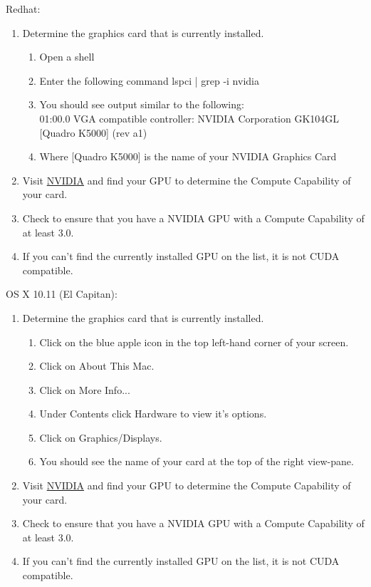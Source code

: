 \documentclass[12pt]{article}
\begin{document}
Redhat:
\begin{enumerate}
\item Determine the graphics card that is currently installed.
\begin{enumerate}
\item Open a shell
\item Enter the following command lspci | grep -i nvidia
\item You should see output similar to the following:\\
01:00.0 VGA compatible controller: NVIDIA Corporation GK104GL [Quadro K5000] (rev a1)
\item Where [Quadro K5000] is the name of your NVIDIA Graphics Card
\end{enumerate}
\item Visit \href{https://developer.nvidia.com/cuda-gpus}{NVIDIA} and find your GPU to determine the Compute Capability of your card.
\item Check to ensure that you have a NVIDIA GPU with a  Compute Capability of at least 3.0.
\item If you can't find the currently installed GPU on the list, it is not CUDA compatible.
\end{enumerate}

OS X 10.11 (El Capitan):
\begin{enumerate}
\item Determine the graphics card that is currently installed.
\begin{enumerate}
\item Click on the blue apple icon in the top left-hand corner of your screen.
\item Click on About This Mac.
\item Click on More Info...
\item Under Contents click Hardware to view it's options.
\item Click on Graphics/Displays.
\item You should see the name of your card at the top of the right view-pane.
\end{enumerate}
\item Visit \href{https://developer.nvidia.com/cuda-gpus}{NVIDIA} and find your GPU to determine the Compute Capability of your card.
\item Check to ensure that you have a NVIDIA GPU with a  Compute Capability of at least 3.0.
\item If you can't find the currently installed GPU on the list, it is not CUDA compatible.
\end{enumerate}
\end{document}
